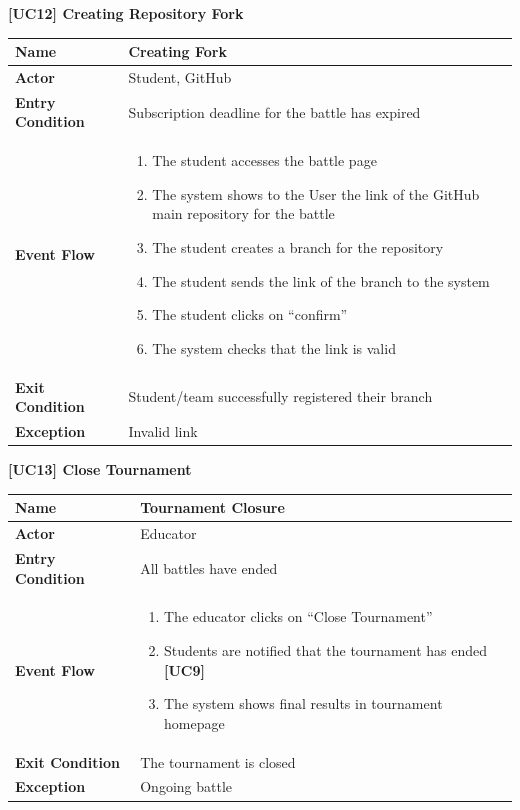 \documentclass{article}
\begin{document}
\begin{table}
 \renewcommand{\arraystretch}{1.5}
    \centering
    \raggedright\textbf{[UC12] Creating Repository Fork}
    \begin{tabular}{|l|p{10cm}|}
        \hline
        \textbf{Name} & Creating Fork \\
        \hline
        \textbf{Actor} & Student, GitHub \\
        \hline
        \textbf{Entry Condition} & Subscription deadline for the battle has expired\\
        \hline
        \textbf{Event Flow} & 
        \begin{enumerate}[align=left, topsep=0pt, partopsep=0pt]
            \item The student accesses the battle page
            \item The system shows to the User the link of the GitHub main repository for the battle
            \item The student creates a branch for the repository  
            \item The student sends the link of the branch to the system
            \item The student clicks on “confirm”
            \item The system checks that the link is valid
        \end{enumerate} \\
        \hline
        \textbf{Exit Condition} & Student/team successfully registered their branch \\
        \hline
        \textbf{Exception} & Invalid link \\
        \hline
    \end{tabular}
\end{table}

\begin{table}
 \renewcommand{\arraystretch}{1.5}
    \centering
    \raggedright\textbf{[UC13] Close Tournament}
    \begin{tabular}{|l|p{10cm}|}
        \hline
        \textbf{Name} & Tournament Closure \\
        \hline
        \textbf{Actor} & Educator \\
        \hline
        \textbf{Entry Condition} & All battles have ended\\
        \hline
        \textbf{Event Flow} & 
        \begin{enumerate}[align=left, topsep=0pt, partopsep=0pt]
            \item The educator clicks on “Close Tournament”
            \item Students are notified that the tournament has ended \textbf{[UC9]}
            \item The system shows final results in tournament homepage 
        \end{enumerate} \\
        \hline
        \textbf{Exit Condition} & The tournament is closed \\
        \hline
        \textbf{Exception} & Ongoing battle \\
        \hline
    \end{tabular}
\end{table}
\end{document}
